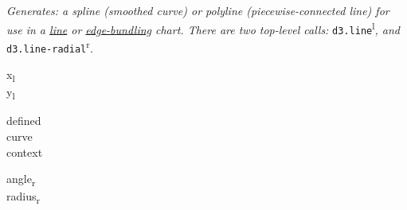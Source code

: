 \textit{Generates: a spline (smoothed curve) or polyline (piecewise-connected line) for use in a \href{https://observablehq.com/@d3/line-chart}{line} or \href{https://observablehq.com/@d3/hierarchical-edge-bundling}{edge-bundling} chart. There are two top-level calls: }\texttt{d3.line}\textsuperscript{l}\textit{, and }\texttt{d3.line-radial}\textsuperscript{r}\textit{.}\\

{\footnotesize
\begin{minipage}[t]{2.0cm}
    x\textsubscript{l}\\
    y\textsubscript{l}\\
\end{minipage}
\begin{minipage}[t]{2.0cm}
    defined\\
    curve\\
    context
\end{minipage}
\begin{minipage}[t]{2.0cm}
    angle\textsubscript{r}\\
    radius\textsubscript{r}\\
\end{minipage}
}



